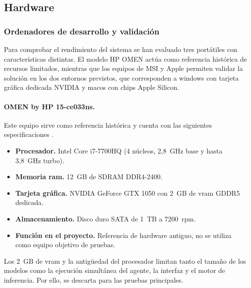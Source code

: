 \subsection{Hardware}\label{subsec:hardware-localmind}

\subsubsection{Ordenadores de desarrollo y validación}

Para comprobar el rendimiento del sistema se han evaluado tres portátiles con características distintas. El modelo HP OMEN actúa como referencia histórica de recursos limitados, mientras que los equipos de MSI y Apple permiten validar la solución en los dos entornos previstos, que corresponden a \gls{windows} con tarjeta gráfica dedicada NVIDIA y \gls{macos} con chips Apple Silicon.

\paragraph{OMEN by HP 15-ce033ns.}
Este equipo sirve como referencia histórica y cuenta con las siguientes especificaciones \cite{hp2017omen15ce033ns}.
\begin{itemize}[leftmargin=*,nosep]
    \item \textbf{Procesador.} Intel Core i7-7700HQ (4 núcleos, 2,8~GHz base y hasta 3,8~GHz turbo).
    \item \textbf{Memoria \gls{ram}.} 12~GB de SDRAM DDR4-2400.
    \item \textbf{Tarjeta gráfica.} NVIDIA GeForce GTX 1050 con 2~GB de \gls{vram} GDDR5 dedicada.
    \item \textbf{Almacenamiento.} Disco duro SATA de 1~TB a 7200~rpm.
    \item \textbf{Función en el proyecto.} Referencia de hardware antiguo, no se utiliza como equipo objetivo de pruebas.
\end{itemize}
Los 2~GB de \gls{vram} y la antigüedad del procesador limitan tanto el tamaño de los modelos como la ejecución simultánea del agente, la interfaz y el motor de inferencia. Por ello, se descarta para las pruebas principales.


